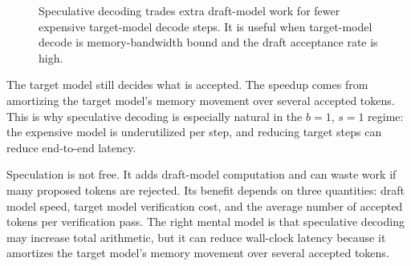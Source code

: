 \documentclass[11pt]{article}
\begin{document}
\begin{figure}[H]
\centering
{}
\caption{Speculative decoding trades extra draft-model work for fewer expensive target-model decode steps.  It is useful when target-model decode is memory-bandwidth bound and the draft acceptance rate is high.}
\label{fig:speculative}
\end{figure}

The target model still decides what is accepted.  The speedup comes from amortizing the target model's memory movement over several accepted tokens.  This is why speculative decoding is especially natural in the \(b=1\), \(s=1\) regime: the expensive model is underutilized per step, and reducing target steps can reduce end-to-end latency.

Speculation is not free.  It adds draft-model computation and can waste work if many proposed tokens are rejected.  Its benefit depends on three quantities: draft model speed, target model verification cost, and the average number of accepted tokens per verification pass.  The right mental model is that speculative decoding may increase total arithmetic, but it can reduce wall-clock latency because it amortizes the target model's memory movement over several accepted tokens.
\end{document}
